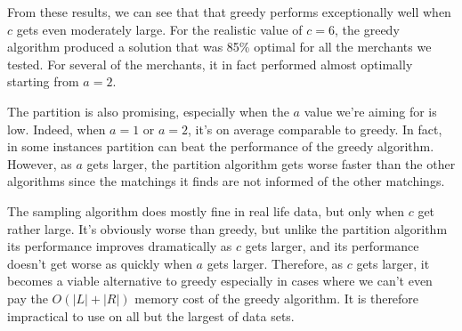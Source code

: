 From these results, we can see that that greedy performs exceptionally well when $c$ gets even moderately large.
For the realistic value of $c=6$, the greedy algorithm produced a solution that was 85\% optimal for all the
merchants we tested. For several of the merchants, it in fact performed almost optimally starting from $a=2$. 

The partition is also promising, especially when the $a$ value we're aiming for is low. Indeed, when $a=1$ or $a=2$,
it's on average comparable to greedy. In fact, in some instances partition can beat the performance of the greedy
algorithm. However, as $a$ gets larger, the partition algorithm gets worse faster than the other algorithms since
the matchings it finds are not informed of the other matchings.

The sampling algorithm does mostly fine in real life data, but only when $c$ get rather large. It's obviously worse
than greedy, but unlike the partition algorithm its performance improves dramatically as $c$ gets larger, and its 
performance doesn't get worse as quickly when $a$ gets larger. Therefore, as $c$ gets larger, it becomes a viable
alternative to greedy especially in cases where we can't even pay the $O(|L|+|R|)$ memory cost of the greedy algorithm.
It is therefore impractical to use on all but the largest of data sets.